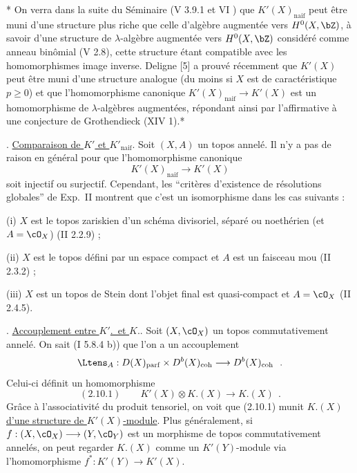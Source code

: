 * On verra dans la suite du S\'{e}minaire (V 3.9.1 et VI \quad \quad) que $K'(X)_{\mathrm{naif}}$ peut \^{e}tre muni d'une structure plus riche que celle d'alg\`{e}bre augment\'{e}e vers $H^0(X, \bZ)$, \`{a} savoir d'une structure de $\lambda$-alg\`{e}bre augment\'{e}e vers $H^0(X, \bZ)$ consid\'{e}r\'{e} comme anneau bin\^{o}mial (V 2.8), cette structure \'{e}tant compatible avec les homomorphismes image inverse. Deligne [5] a prouv\'{e} r\'{e}cemment que $K'(X)$ peut \^{e}tre muni d'une structure analogue (du moins si $X$ est de caract\'{e}ristique $p \geq 0$) et que l'homomorphisme canonique $K'(X)_{\mathrm{naif}} \longrightarrow K'(X)$ est un homomorphisme de $\lambda$-alg\`{e}bres augment\'{e}es, r\'{e}pondant ainsi par l'affirmative \`{a} une conjecture de Grothendieck (XIV 1).*

\medskip

. \underline{Comparaison de $K'$ et $K'_{\mathrm{naif}}$}. Soit $(X, A)$ un topos annel\'{e}. Il n'y a pas de raison en g\'{e}n\'{e}ral pour que l'homomorphisme canonique
\[
K'(X)_{\mathrm{naif}} \longrightarrow K'(X)
\]
soit injectif ou surjectif. Cependant, les ``crit\`{e}res d'existence de r\'{e}solutions globales'' de Exp.\ II montrent que c'est un isomorphisme dans les cas suivants :

\smallskip

(i) $X$ est le topos zariskien d'un sch\'{e}ma divisoriel, s\'{e}par\'{e} ou noeth\'{e}rien (et $A = \cO_X$) (II 2.2.9) ;

(ii) $X$ est le topos d\'{e}fini par un espace compact et $A$ est un faisceau mou (II 2.3.2) ;

(iii) $X$ est un topos de Stein dont l'objet final est quasi-compact et $A = \cO_X$ (II 2.4.5).

\medskip

. \underline{Accouplement entre $K'$.\ et $K.$}. Soit $(X, \cO_X)$ un topos commutativement annel\'{e}. On sait (I 5.8.4 b)) que l'on a un accouplement
\[
\Ltens_A : D(X)_{\mathrm{parf}} \times D^b(X)_{\mathrm{coh}} \longrightarrow D^b(X)_{\mathrm{coh}}\ \ .
\]
Celui-ci d\'{e}finit un homomorphisme
\[
\mathrm{(2.10.1)} \qquad K'(X) \otimes K.(X) \longrightarrow K.(X)\ \ .
\]
Gr\^{a}ce \`{a} l'associativit\'{e} du produit tensoriel, on voit que (2.10.1) munit $K.(X)$ \underline{d'une structure de $K'(X)$-module}. Plus g\'{e}n\'{e}ralement, si $f : (X, \cO_X) \longrightarrow (Y, \cO_Y)$ est un morphisme de topos commutativement annel\'{e}s, on peut regarder $K.(X)$ comme un $K'(Y)$-module via l'homomorphisme $f^* : K'(Y) \longrightarrow K'(X)$.

